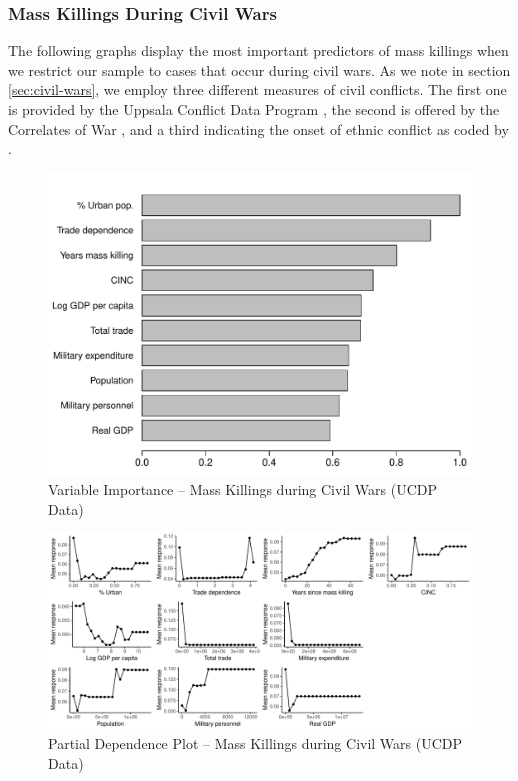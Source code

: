\subsubsection{Mass Killings During Civil Wars}

The following graphs display the most important predictors of mass killings when we restrict our sample to cases that occur during civil wars. As we note in section \ref{sec:civil-wars}, we employ three different measures of civil conflicts. The first one is provided by the Uppsala Conflict Data Program \citep{allansson2017organized,gleditsch2002armed}, the second is offered by the Correlates of War \citep{sarkees2010resort}, and a third indicating the onset of ethnic conflict as coded by \citet{cederman2010ethnic}.  

\begin{figure}[H]
    \centering
    \includegraphics[width=.85\textwidth]{images/rf-ucdp.pdf}
    \caption{Variable Importance -- Mass Killings during Civil Wars (UCDP Data)}
    \label{fig:rf-mk-ucdp}
\end{figure}

\newpage 

\clearpage
\begin{figure}
    \centering
    \includegraphics[width=\textwidth]{images/rf-ucdp-pd.pdf}
    \caption{Partial Dependence Plot -- Mass Killings during Civil Wars (UCDP Data)}
    \label{fig:rf-mk-ucdp-pd}
\end{figure}
\clearpage


